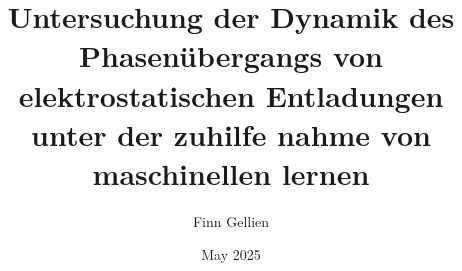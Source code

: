 \title{Untersuchung der Dynamik des Phasenübergangs von elektrostatischen Entladungen unter der zuhilfe nahme von maschinellen lernen}
\author{Finn Gellien}
\date{May 2025}


\newcommand{\university}{Goethe Universität Frankfurt}

\newcommand{\universitylong}{Johann Wolfgang Goethe-Universität Frankfurt am Main}

\newcommand{\department}{Fachbereich 13 / Institut für Angewandte Physik}

\newcommand{\fachbereich}{Studiengang Physik (M.Sc.)}
\newcommand{\degree}{Master of Science in Physics}
\newcommand{\supervisor}{Dr. Oliver Meusel}
\newcommand{\cosupervisor}{missing}
